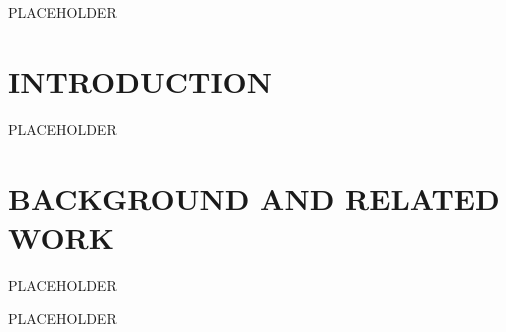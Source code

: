 \documentclass[12pt]{article}
\begin{document}
\begin{executivesummary}
PLACEHOLDER
\end{executivesummary}

\chapter{INTRODUCTION}

PLACEHOLDER

\chapter{BACKGROUND AND RELATED WORK}

PLACEHOLDER

\begin{acknowledgments}
PLACEHOLDER
\end{acknowledgments}


\end{document}
